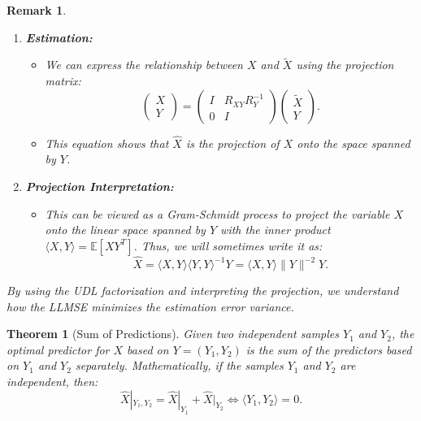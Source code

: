 \documentclass[a4 paper]{article}
\numberwithin{equation}{section}
\theoremstyle{boldStyle}
\newtheorem{remark}{Remark}[section]
\theoremstyle{boldBlueStyle}
\theoremstyle{boldPurpleStyle}
\newtheorem{theorem}{Theorem}[section]
\theoremstyle{boldRedStyle}
\theoremstyle{boldGreenStyle}
\begin{document}
\begin{remark}
\begin{enumerate}
      \item \textbf{Estimation:}
      \begin{itemize}
          \item We can express the relationship between \( X \) and \( \tilde{X} \) using the projection matrix:
          \[
          \begin{pmatrix}
          X \\
          Y
          \end{pmatrix} =
          \begin{pmatrix}
          I & R_{XY} R_Y^{-1} \\
          0 & I
          \end{pmatrix}
          \begin{pmatrix}
          \tilde{X} \\
          Y
          \end{pmatrix}.
          \]
          \item This equation shows that \( \hat{X} \) is the projection of \( X \) onto the space spanned by \( Y \).
      \end{itemize}
      
      \item \textbf{Projection Interpretation:}
      \begin{itemize}
          \item This can be viewed as a Gram-Schmidt process to project the variable \( X \) onto the linear space spanned by \( Y \) with the inner product \( \langle X, Y \rangle = \mathbb{E}[XY^T] \). Thus, we will sometimes write it as:
          \[
          \hat{X} = \langle X, Y \rangle \langle Y, Y \rangle^{-1} Y = \langle X, Y \rangle \|Y\|^{-2} Y.
          \]
      \end{itemize}
  \end{enumerate}
  
  By using the UDL factorization and interpreting the projection, we understand how the LLMSE minimizes the estimation error variance.
  \end{remark}


\begin{theorem}[Sum of Predictions]
  Given two independent samples \( Y_1 \) and \( Y_2 \), the optimal predictor for \( X \) based on \( Y = (Y_1, Y_2) \) is the sum of the predictors based on \( Y_1 \) and \( Y_2 \) separately. Mathematically, if the samples \( Y_1 \) and \( Y_2 \) are independent, then:
  \[
  \hat{X}|_{Y_1, Y_2} = \hat{X}|_{Y_1} + \hat{X}|_{Y_2} \iff \langle Y_1, Y_2 \rangle = 0.
  \]
\end{theorem}
  
\end{document}
